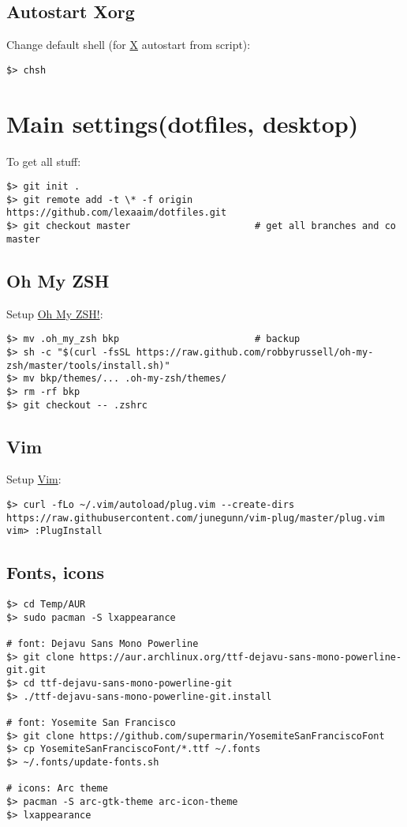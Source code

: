 \documentclass[a4paper, 12pt]{article}
\begin{document}
\subsection{Autostart Xorg}
Change default shell (for \url{X} autostart from  script):
\begin{lstlisting}
$> chsh
\end{lstlisting}

\section{Main settings(dotfiles, desktop)}

To get all stuff:
\begin{lstlisting}
$> git init .
$> git remote add -t \* -f origin https://github.com/lexaaim/dotfiles.git
$> git checkout master                      # get all branches and co master
\end{lstlisting}

\subsection{Oh My ZSH}
Setup \url{Oh My ZSH!}:
\begin{lstlisting}
$> mv .oh_my_zsh bkp                        # backup
$> sh -c "$(curl -fsSL https://raw.github.com/robbyrussell/oh-my-zsh/master/tools/install.sh)"
$> mv bkp/themes/... .oh-my-zsh/themes/
$> rm -rf bkp
$> git checkout -- .zshrc
\end{lstlisting}

\subsection{Vim}
Setup \url{Vim}:
\begin{lstlisting}
$> curl -fLo ~/.vim/autoload/plug.vim --create-dirs  https://raw.githubusercontent.com/junegunn/vim-plug/master/plug.vim
vim> :PlugInstall
\end{lstlisting}

\subsection{Fonts, icons}
\begin{lstlisting}
$> cd Temp/AUR
$> sudo pacman -S lxappearance

# font: Dejavu Sans Mono Powerline
$> git clone https://aur.archlinux.org/ttf-dejavu-sans-mono-powerline-git.git
$> cd ttf-dejavu-sans-mono-powerline-git
$> ./ttf-dejavu-sans-mono-powerline-git.install

# font: Yosemite San Francisco
$> git clone https://github.com/supermarin/YosemiteSanFranciscoFont
$> cp YosemiteSanFranciscoFont/*.ttf ~/.fonts
$> ~/.fonts/update-fonts.sh

# icons: Arc theme
$> pacman -S arc-gtk-theme arc-icon-theme
$> lxappearance
\end{lstlisting}
\end{document}
